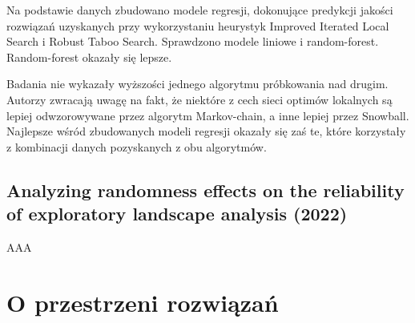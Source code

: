 Na podstawie danych zbudowano modele regresji, dokonujące predykcji jakości rozwiązań
uzyskanych przy wykorzystaniu heurystyk Improved Iterated Local Search i Robust Taboo Search.
Sprawdzono modele liniowe i random-forest. Random-forest okazały się lepsze.

Badania nie wykazały wyższości jednego algorytmu próbkowania nad drugim. Autorzy zwracają uwagę na fakt, że niektóre z cech
sieci optimów lokalnych są lepiej odwzorowywane przez algorytm Markov-chain, a inne lepiej przez Snowball.
Najlepsze wśród zbudowanych modeli regresji okazały się zaś te, które korzystały z kombinacji danych pozyskanych z obu algorytmów.

\subsection*{Analyzing randomness effects on the reliability of exploratory landscape analysis (2022)\cite{DBLP:journals/nc/MunozKS22}}
AAA




\section{O przestrzeni rozwiązań}